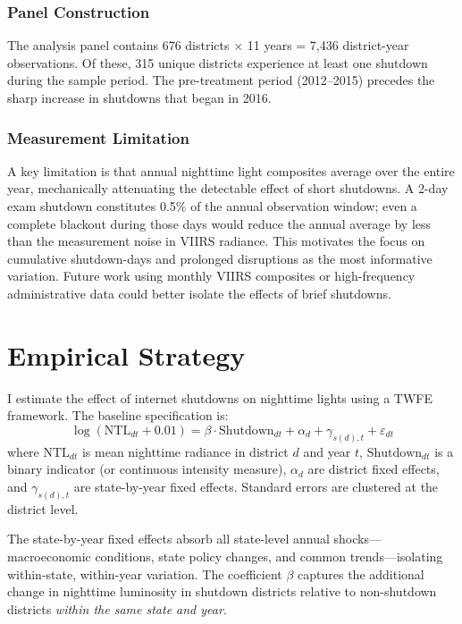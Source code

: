 \documentclass[12pt]{article}
\begin{document}
\subsubsection*{Panel Construction} The analysis panel contains 676 districts $\times$ 11 years = 7,436 district-year observations. Of these, 315 unique districts experience at least one shutdown during the sample period. The pre-treatment period (2012--2015) precedes the sharp increase in shutdowns that began in 2016.

\subsubsection*{Measurement Limitation} A key limitation is that annual nighttime light composites average over the entire year, mechanically attenuating the detectable effect of short shutdowns. A 2-day exam shutdown constitutes 0.5\% of the annual observation window; even a complete blackout during those days would reduce the annual average by less than the measurement noise in VIIRS radiance. This motivates the focus on cumulative shutdown-days and prolonged disruptions as the most informative variation. Future work using monthly VIIRS composites or high-frequency administrative data could better isolate the effects of brief shutdowns.




\section{Empirical Strategy}

I estimate the effect of internet shutdowns on nighttime lights using a TWFE framework. The baseline specification is:
\begin{equation}
\log(\text{NTL}_{dt} + 0.01) = \beta \cdot \text{Shutdown}_{dt} + \alpha_d + \gamma_{s(d),t} + \varepsilon_{dt}
\label{eq:main}
\end{equation}
where $\text{NTL}_{dt}$ is mean nighttime radiance in district $d$ and year $t$, $\text{Shutdown}_{dt}$ is a binary indicator (or continuous intensity measure), $\alpha_d$ are district fixed effects, and $\gamma_{s(d),t}$ are state-by-year fixed effects. Standard errors are clustered at the district level.

The state-by-year fixed effects absorb all state-level annual shocks---macroeconomic conditions, state policy changes, and common trends---isolating within-state, within-year variation. The coefficient $\beta$ captures the additional change in nighttime luminosity in shutdown districts relative to non-shutdown districts \emph{within the same state and year}.
\end{document}
